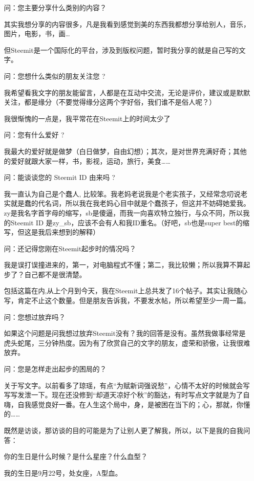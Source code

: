 \documentclass[]{ctexbook}
\begin{document}
问：您主要分享什么类别的内容？

其实我想分享的内容很多，凡是我看到感觉到美的东西我都想分享给别人，音乐，图片，电影，书，画\ldots{}

但Steemit是一个国际化的平台，涉及到版权问题，暂时我分享的就是自己写的文字。

问：您想什么类似的朋友关注您 ?

我希望看我文字的朋友能留言，人都是在互动中交流，无论是评价，建议或是默默关注，都是缘分（不要觉得缘分这两个字好俗，我们谁不是俗人呢？）

我很惭愧的一点是，我平常花在Steemit上的时间太少了

问：您有什么爱好 ?

我最大的爱好就是做梦（白日做梦，自由幻想）；其次，是对世界充满好奇；其他的爱好就跟大家一样，书，影视，运动，旅行，美食\ldots{}\ldots{}

问：能谈谈您的 Steemit ID 由来吗 ?

我一直认为自己是个蠢人, 比较笨。我老妈老说我是个老实孩子，又经常念叨说老实就是蠢的代名词，所以我在我老妈心目中就是个蠢孩子，但这并不妨碍她爱我。zy是我名字首字母的缩写，sb是傻逼，而我一向喜欢特立独行，与众不同，所以我的Steemit ID 是zy\_sb，应该不会有人和我ID重名。（好吧，sb也是super best的缩写，但这是我后来想到的解释）

问：还记得您刚在Steemit起步时的情况吗？

我是误打误撞进来的，第一，对电脑程式不懂；第二，我比较懒；所以我算不算起步了？自己都不是很清楚。

包括这篇在内,从上个月到今天，我在Steemit上总共发了16个帖子。其实让我随心写，肯定不止这个数量。但是朋友告诉我，不要发水帖，所以希望至少一周一篇。

问：您想过放弃吗？

如果这个问题是问我想过放弃Steemit没有？我的回答是没有。虽然我做事经常是虎头蛇尾，三分钟热度。因为有了欣赏自己的文字的朋友，虚荣和骄傲，让我很难放弃。

问：您是怎样走出起步的困局的？

关于写文字。以前看多了琼瑶，有点``为赋新词强说愁''，心情不太好的时候就会写写写发泄一下。现在还没修到``却道天凉好个秋''的豁达，有时写点文字就是为了自嗨，自我感觉良好一番。在人生这个局中，身，是被困在当下的；心，那就，你懂的\ldots{}\ldots{}

既然是访谈，那访谈的目的可能是为了让别人更了解我，所以，以下是我的自我问答：

你的生日是什么时候？是什么星座？什么血型？

我的生日是9月22号，处女座，A型血。
\end{document}
